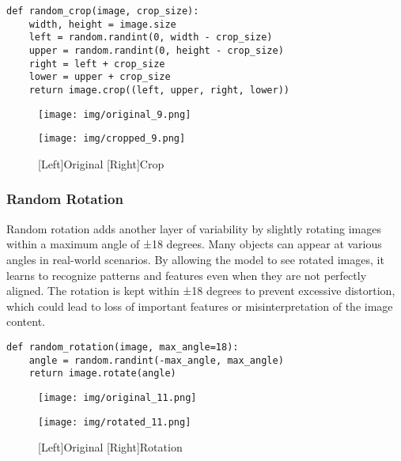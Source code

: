 \documentclass[a4paper,11pt]{article}
\begin{document}
\begin{listing}[!ht]
\begin{verbatim}
def random_crop(image, crop_size):
    width, height = image.size
    left = random.randint(0, width - crop_size)
    upper = random.randint(0, height - crop_size)
    right = left + crop_size
    lower = upper + crop_size
    return image.crop((left, upper, right, lower))
\end{verbatim}
\label{listing:python}
\end{listing}

\begin{figure}[H]
    \centering
    \begin{minipage}{0.49\textwidth}
        \texttt{[image: img/original\_9.png]}
    \end{minipage}
    \hfill
    \begin{minipage}{0.49\textwidth}
        \texttt{[image: img/cropped\_9.png]}
    \end{minipage}
    \caption{[Left]Original [Right]Crop}
\end{figure}

\subsubsection{Random Rotation}
Random rotation adds another layer of variability by slightly rotating images within a maximum angle of ±18 degrees. Many objects can appear at various angles in real-world scenarios. By allowing the model to see rotated images, it learns to recognize patterns and features even when they are not perfectly aligned. The rotation is kept within ±18 degrees to prevent excessive distortion, which could lead to loss of important features or misinterpretation of the image content.

\begin{listing}[!ht]
\begin{verbatim}
def random_rotation(image, max_angle=18):
    angle = random.randint(-max_angle, max_angle)
    return image.rotate(angle)
\end{verbatim}
\label{listing:python}
\end{listing}

\begin{figure}[H]
    \centering
    \begin{minipage}{0.49\textwidth}
        \texttt{[image: img/original\_11.png]}
    \end{minipage}
    \hfill
    \begin{minipage}{0.49\textwidth}
        \texttt{[image: img/rotated\_11.png]}
    \end{minipage}
    \caption{[Left]Original [Right]Rotation}
\end{figure}
\end{document}
